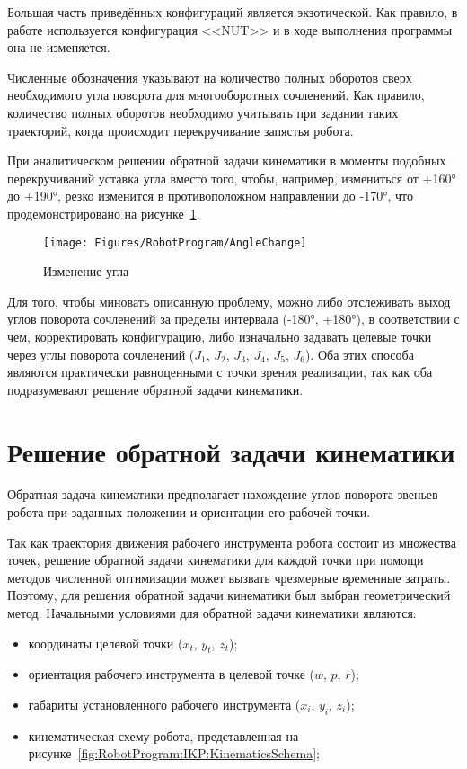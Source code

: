 Большая часть приведённых конфигураций является экзотической.
Как правило, в работе используется конфигурация <<NUT>> и в ходе выполнения программы она не изменяется.

Численные обозначения указывают на количество полных оборотов сверх необходимого угла поворота для многооборотных сочленений.
Как правило, количество полных оборотов необходимо учитывать при задании таких траекторий, когда происходит перекручивание запястья робота.

При аналитическом решении обратной задачи кинематики в моменты подобных перекручиваний уставка угла вместо того, чтобы, например, измениться от +160° до +190°, резко изменится в противоположном направлении до -170°, что продемонстрировано на рисунке~\ref{fig:RobotProgram:AngleChange}.

\begin{figure}[H]
    \centering
    \vspace{14pt}
    \texttt{[image: Figures/RobotProgram/AngleChange]}
    \caption{Изменение угла}
    \label{fig:RobotProgram:AngleChange}
\end{figure}

Для того, чтобы миновать описанную проблему, можно либо отслеживать выход углов поворота сочленений за пределы интервала (-180°, +180°), в соответствии с чем, корректировать конфигурацию, либо изначально задавать целевые точки через углы поворота сочленений ($J_1$, $J_2$, $J_3$, $J_4$, $J_5$, $J_6$).
Оба этих способа являются практически равноценными с точки зрения реализации, так как оба подразумевают решение обратной задачи кинематики.


\section{Решение обратной задачи кинематики}
Обратная задача кинематики предполагает нахождение углов поворота звеньев робота при заданных положении и ориентации его рабочей точки.

Так как траектория движения рабочего инструмента робота состоит из множества точек, решение обратной задачи кинематики для каждой точки при помощи методов численной оптимизации может вызвать чрезмерные временные затраты.
Поэтому, для решения обратной задачи кинематики был выбран геометрический метод.
Начальными условиями для обратной задачи кинематики являются:

\begin{itemize}
    \item координаты целевой точки ($x_t$, $y_t$, $z_t$);
    \item ориентация рабочего инструмента в целевой точке ($w$, $p$, $r$);
    \item габариты установленного рабочего инструмента ($x_i$, $y_i$, $z_i$);
    \item кинематическая схему робота, представленная на рисунке~\ref{fig:RobotProgram:IKP:KinematicsSchema};
\end{itemize}

